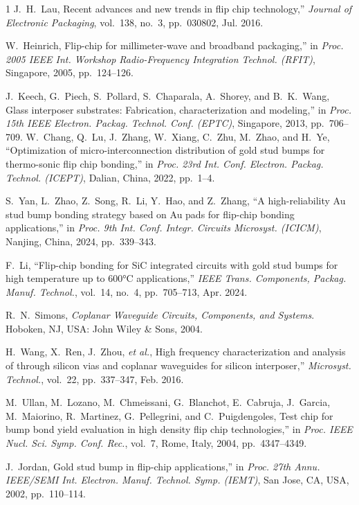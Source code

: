 \documentclass[conference]{IEEEtran}
\begin{document}
\begin{thebibliography}{1}
J.~H.~Lau, Recent advances and new trends in flip chip technology,'' \emph{Journal of Electronic Packaging}, vol.~138, no.~3, pp.~030802, Jul. 2016.

W.~Heinrich, 
Flip-chip for millimeter-wave and broadband packaging,'' 
in \emph{Proc. 2005 IEEE Int. Workshop Radio-Frequency Integration Technol. (RFIT)}, Singapore, 2005, pp.~124--126.

J.~Keech, G.~Piech, S.~Pollard, S.~Chaparala, A.~Shorey, and B.~K.~Wang, 
Glass interposer substrates: Fabrication, characterization and modeling,'' 
in \emph{Proc. 15th IEEE Electron. Packag. Technol. Conf. (EPTC)}, Singapore, 2013, pp.~706--709.
W.~Chang, Q.~Lu, J.~Zhang, W.~Xiang, C.~Zhu, M.~Zhao, and H.~Ye,  
``Optimization of micro-interconnection distribution of gold stud bumps for thermo-sonic flip chip bonding,''  
in \emph{Proc. 23rd Int. Conf. Electron. Packag. Technol. (ICEPT)}, Dalian, China, 2022, pp.~1--4.

S.~Yan, L.~Zhao, Z.~Song, R.~Li, Y.~Hao, and Z.~Zhang, 
``A high-reliability Au stud bump bonding strategy based on Au pads for flip-chip bonding applications,'' 
in \emph{Proc. 9th Int. Conf. Integr. Circuits Microsyst. (ICICM)}, Nanjing, China, 2024, pp.~339--343.

F.~Li,  
``Flip-chip bonding for SiC integrated circuits with gold stud bumps for high temperature up to 600°C applications,''  
\emph{IEEE Trans. Components, Packag. Manuf. Technol.}, vol.~14, no.~4, pp.~705--713, Apr. 2024.

R.~N.~Simons,  
\emph{Coplanar Waveguide Circuits, Components, and Systems}.  
Hoboken, NJ, USA: John Wiley \& Sons, 2004.

H.~Wang, X.~Ren, J.~Zhou, \emph{et al.}, 
High frequency characterization and analysis of through silicon vias and coplanar waveguides for silicon interposer,'' 
\emph{Microsyst. Technol.}, vol.~22, pp.~337--347, Feb. 2016.

M.~Ullan, M.~Lozano, M.~Chmeissani, G.~Blanchot, E.~Cabruja, J.~Garcia, M.~Maiorino, R.~Martinez, G.~Pellegrini, and C.~Puigdengoles,  
Test chip for bump bond yield evaluation in high density flip chip technologies,''  
in \emph{Proc. IEEE Nucl. Sci. Symp. Conf. Rec.}, vol.~7, Rome, Italy, 2004, pp.~4347--4349.

J.~Jordan,  
Gold stud bump in flip-chip applications,''  
in \emph{Proc. 27th Annu. IEEE/SEMI Int. Electron. Manuf. Technol. Symp. (IEMT)}, San Jose, CA, USA, 2002, pp.~110--114.


\end{thebibliography}
\end{document}
